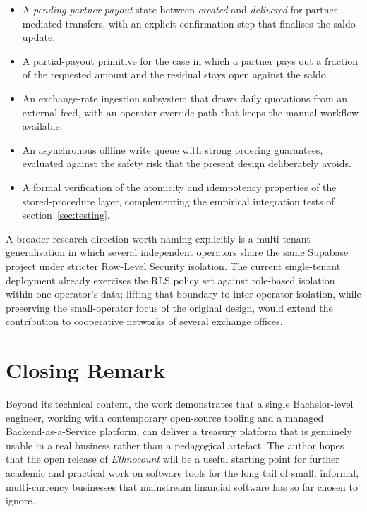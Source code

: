 \begin{itemize}[leftmargin=1.2cm]
  \item A \emph{pending-partner-payout} state between \emph{created} and \emph{delivered} for partner-mediated transfers, with an explicit confirmation step that finalises the saldo update.
  \item A partial-payout primitive for the case in which a partner pays out a fraction of the requested amount and the residual stays open against the saldo.
  \item An exchange-rate ingestion subsystem that draws daily quotations from an external feed, with an operator-override path that keeps the manual workflow available.
  \item An asynchronous offline write queue with strong ordering guarantees, evaluated against the safety risk that the present design deliberately avoids.
  \item A formal verification of the atomicity and idempotency properties of the stored-procedure layer, complementing the empirical integration tests of section~\ref{sec:testing}.
\end{itemize}

A broader research direction worth naming explicitly is a multi-tenant generalisation in which several independent operators share the same Supabase project under stricter Row-Level Security isolation. The current single-tenant deployment already exercises the RLS policy set against role-based isolation within one operator's data; lifting that boundary to inter-operator isolation, while preserving the small-operator focus of the original design, would extend the contribution to cooperative networks of several exchange offices.

\section*{Closing Remark}
Beyond its technical content, the work demonstrates that a single Bachelor-level engineer, working with contemporary open-source tooling and a managed Backend-as-a-Service platform, can deliver a treasury platform that is genuinely usable in a real business rather than a pedagogical artefact. The author hopes that the open release of \emph{Ethnocount} will be a useful starting point for further academic and practical work on software tools for the long tail of small, informal, multi-currency businesses that mainstream financial software has so far chosen to ignore.

